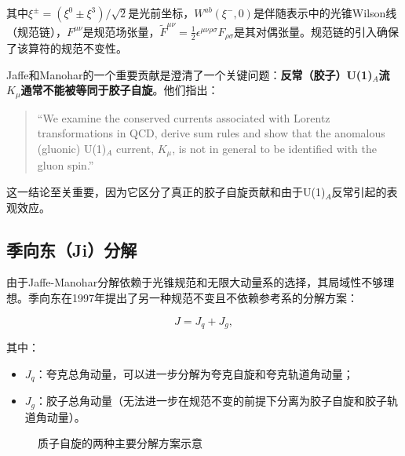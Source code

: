 \documentclass[12pt,a4paper]{ctexart}
\theoremstyle{definition}
\begin{document}
其中$\xi^\pm = (\xi^0 \pm \xi^3)/\sqrt{2}$是光前坐标，$W^{ab}(\xi^-,0)$是伴随表示中的光锥Wilson线（规范链），$F^{\mu\nu}$是规范场张量，$\tilde{F}^{\mu\nu} = \frac{1}{2}\epsilon^{\mu\nu\rho\sigma}F_{\rho\sigma}$是其对偶张量。规范链的引入确保了该算符的规范不变性。

Jaffe和Manohar的一个重要贡献是澄清了一个关键问题：\textbf{反常（胶子）U(1)$_A$流$K_\mu$通常不能被等同于胶子自旋}。他们指出：

\begin{quote}
``We examine the conserved currents associated with Lorentz transformations in QCD, derive sum rules and show that the anomalous (gluonic) U(1)$_A$ current, $K_\mu$, is not in general to be identified with the gluon spin.''
\end{quote}

这一结论至关重要，因为它区分了真正的胶子自旋贡献和由于U(1)$_A$反常引起的表观效应。

\subsection{季向东（Ji）分解}

由于Jaffe-Manohar分解依赖于光锥规范和无限大动量系的选择，其局域性不够理想。季向东在1997年提出了另一种规范不变且不依赖参考系的分解方案\cite{Ji1997}：

\begin{equation}
J = J_q + J_g,
\label{eq:Ji_decomposition}
\end{equation}

其中：
\begin{itemize}
    \item $J_q$：夸克总角动量，可以进一步分解为夸克自旋和夸克轨道角动量；
    \item $J_g$：胶子总角动量（无法进一步在规范不变的前提下分离为胶子自旋和胶子轨道角动量）。
\end{itemize}

\begin{figure}[H]
\centering
{}
\caption{质子自旋的两种主要分解方案示意}
\label{fig:decompositions}
\end{figure}
\end{document}
